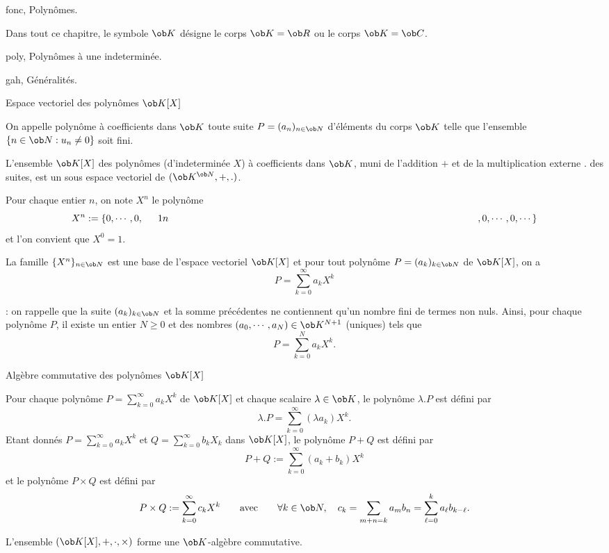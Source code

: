

\Chapter fonc, Polynômes. 
\bigskip

\noindent
Dans tout ce chapitre, le symbole $\ob K$ désigne le corps $\ob K=\ob R$ ou le corps $\ob K=\ob C$. 
\bigskip


\Section poly, Polynômes à une indeterminée. 

\Subsection gah, Généralités.

\Concept [] Espace vectoriel des polynômes $\ob K[X]$

\Definition []  On appelle polynôme à coefficients dans $\ob K$ toute suite $P=(a_n)_{n\in\ob N}$ d'éléments du corps $\ob K$ telle que l'ensemble 
$\{n\in\ob N:u_n\neq0\}$ soit fini.
\bigskip

\Propriete []  L'ensemble $\ob K[X]$ des polynômes (d'indeterminée $X$) à coefficients dans $\ob K$, muni de l'addition $+$ et de la multiplication externe $.$ des suites, est un sous espace vectoriel de $(\ob K^{\ob N},+,.)$. 
\bigskip

\Definition []  Pour chaque entier $n$, on note $X^n$ le polynôme 
$$
X^n:=\{0,\cdots,0,\vtop{\mbox{$1$}\mbox{$n$}},0,\cdots,0,\cdots\}
$$
et l'on convient que $X^0=1$. 
\bigskip

\Propriete []  La famille $\{X^n\}_{n\in\ob N}$ est une base de l'espace vectoriel $\ob K[X]$ et pour tout polynôme $P=(a_k)_{k\in\ob N}$ de $\ob K[X]$, on a 
$$
P=\sum_{k=0}^\infty a_kX^k
$$

\Remarque : on rappelle que la suite $(a_k)_{k\in\ob N}$ et la somme précédentes ne contiennent qu'un nombre fini de termes non nuls. 
Ainsi, pour chaque polynôme $P$, il existe un entier $N\ge0$ et des nombres $(a_0,\cdots,a_N)\in\ob K^{N+1}$ (uniques) tels que 
$$
P=\sum_{k=0}^Na_kX^k.
$$

\Concept [] Algèbre commutative des polynômes $\ob K[X]$ 


\Definition []  Pour chaque polynôme $P=\sum_{k=0}^\infty a_kX^k$ de $\ob K[X]$ et chaque scalaire $\lambda\in\ob K$, le polynôme $\lambda.P$ est défini par 
$$
\lambda.P=\sum_{k=0}^\infty(\lambda a_k)X^k.
$$
Etant donnés $P=\sum_{k=0}^\infty a_kX^k$ et $Q=\sum_{k=0}^\infty b_kX_k$ dans $\ob K[X]$, 
le polynôme $P+Q$ est défini par 
$$
P+Q:=\sum_{k=0}^\infty(a_k+b_k)X^k
$$
et le polynôme $P\times Q$ est défini par
$$
P\times Q:=\sum_{k=0}^\infty c_kX^k\qquad \mbox{avec}\qquad \forall k\in\ob N, \quad c_k=\sum_{m+n=k}a_mb_n=\sum_{\ell=0}^ka_\ell b_{k-\ell}.
$$

\Theoreme []  L'ensemble $(\ob K[X],+,\cdot,\times)$ forme une $\ob K$-algèbre commutative. 

